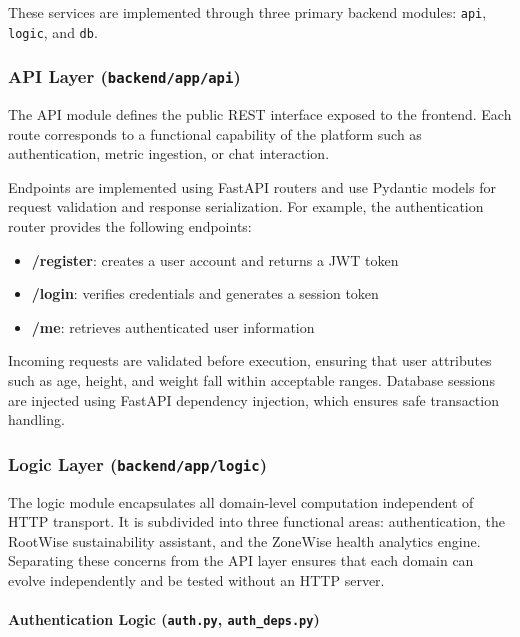 \documentclass[11pt,twocolumn]{article}
\begin{document}
These services are implemented through three primary backend modules: \texttt{api}, \texttt{logic}, and \texttt{db}.

\subsubsection{API Layer (\texttt{backend/app/api})}

The API module defines the public REST interface exposed to the frontend. Each route corresponds to a functional capability of the platform such as authentication, metric ingestion, or chat interaction.

Endpoints are implemented using FastAPI routers and use Pydantic models for request validation and response serialization. For example, the authentication router provides the following endpoints:

\begin{itemize}
\item \textbf{/register}: creates a user account and returns a JWT token
\item \textbf{/login}: verifies credentials and generates a session token
\item \textbf{/me}: retrieves authenticated user information
\end{itemize}

Incoming requests are validated before execution, ensuring that user attributes such as age, height, and weight fall within acceptable ranges. Database sessions are injected using FastAPI dependency injection, which ensures safe transaction handling.

\subsubsection{Logic Layer (\texttt{backend/app/logic})}

The logic module encapsulates all domain-level computation independent of HTTP transport. It is subdivided into three functional areas: authentication, the RootWise sustainability assistant, and the ZoneWise health analytics engine. Separating these concerns from the API layer ensures that each domain can evolve independently and be tested without an HTTP server.

\paragraph{Authentication Logic (\texttt{auth.py}, \texttt{auth\_deps.py})}
\end{document}
